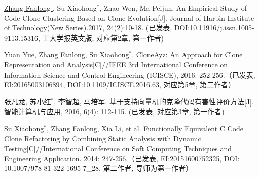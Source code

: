 \begin{publist}
\item
\underline{Zhang Fanlong }, Su Xiaohong{$^*$},  Zhao Wen,  Ma Peijun. An Empirical Study of Code Clone Clustering Based on Clone Evolution[J]. Journal of Harbin Institute of Technology(New Series).2017, 24(2):10-18. (已发表, DOI:10.11916/j.issn.1005-9113.15316, 工大学报英文版, 对应第2章, 第一作者)

\item
Yuan Yue, \underline{Zhang Fanlong},  Su Xiaohong{$^*$}. CloneAyz: An Approach for Clone Representation and Analysis[C]//IEEE 3rd International Conference on Information Science and Control Engineering (ICISCE), 2016: 252-256.（已发表, EI:20165003106894, DOI:10.1109/ICISCE.2016.63, 对应第5章, 第二作者）


\item
\underline{张凡龙}, 苏小红{$^*$},  李智超,  马培军. 基于支持向量机的克隆代码有害性评价方法[J]. 智能计算机与应用, 2016, 6(4): 112-115. (已发表, 对应第3章, 第一作者)

\item
Su Xiaohong{$^*$}, \underline{Zhang Fanlong},  Xia Li, et al. Functionally Equivalent C Code Clone Refactoring by Combining Static Analysis with Dynamic Testing[C]//International Conference on Soft Computing Techniques and Engineering Application. 2014: 247-256.（已发表, EI:20151600752325, DOI: 10.1007/978-81-322-1695-7\_28, 第二作者, 导师为第一作者）
\end{publist}





